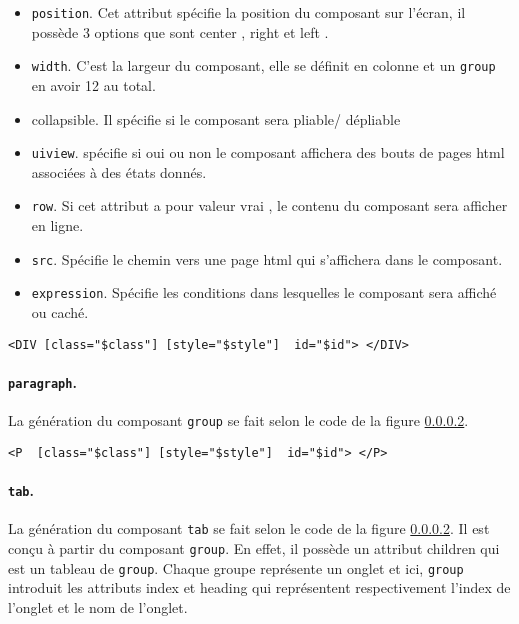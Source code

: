 \documentclass[a4paper,11pt]{report}
\begin{document}
\begin{itemize}
\item {{\tt position}.} Cet attribut spécifie la position du composant sur l'écran, il possède 3 options que sont \og center \fg , \og right \fg et \og left \fg .
\item {{\tt width}.} C'est la largeur du composant, elle se définit en colonne et un {\tt group} en avoir 12 au total.
\item {{collapsible}.} Il spécifie si le composant sera pliable/ dépliable 
\item {{\tt uiview}.} spécifie si oui ou non le composant affichera des bouts de pages html associées à des états donnés.
\item {{\tt row}.} Si cet attribut a pour valeur \og vrai \fg , le contenu du composant sera afficher en ligne.
\item {{\tt src}.} Spécifie le chemin vers une page html qui s'affichera dans le composant.
\item  {{\tt expression}.} Spécifie les  conditions  dans lesquelles le composant sera affiché ou caché.
\end{itemize}

\begin{verbatim}
<DIV [class="$class"] [style="$style"]  id="$id"> </DIV>
\end{verbatim}

\paragraph{{\tt paragraph}. }La génération du composant {\tt group} se fait selon le code de la figure \ref{}.

\begin{verbatim}
<P  [class="$class"] [style="$style"]  id="$id"> </P>
\end{verbatim}
\paragraph{{\tt tab}.}La génération du composant {\tt tab} se fait selon le code de la figure \ref{}. Il est conçu à partir du composant
{\tt group}. En effet, il possède un attribut \og children \fg qui est un tableau de {\tt group}. Chaque groupe représente un onglet et ici, 
{\tt group } introduit les attributs \og index \fg et \og heading \fg qui représentent respectivement l'index de l'onglet et le nom de l'onglet.
\end{document}
